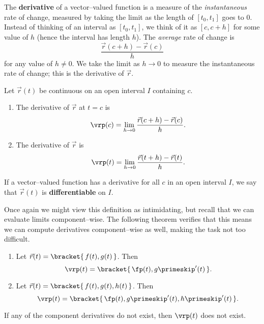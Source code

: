 The \textbf{derivative} of a vector--valued function is a measure of the \emph{instantaneous} rate of change, measured by taking the limit as the length of $[t_0,t_1]$ goes to 0. Instead of thinking of an interval as $[t_0,t_1]$, we think of it as $[c,c+h]$ for some value of $h$ (hence the interval has length $h$).  The \emph{average} rate of change is 
\[\frac{\vec r(c+h)-\vec r(c)}{h}\]
for any value of $h\neq0$. We take the limit as $h\to0$ to measure the instantaneous rate of change; this is the derivative of $\vec r$.


{Let $\vec r(t)$ be continuous on an open interval $I$ containing $c$.
\begin{enumerate}
	\item The derivative of $\vec r$ at $t=c$ is
	\[\vrp (c) = \lim_{h\to 0} \frac{\vec r(c+h) - \vec r(c)}{h}.\]
	\item	The derivative of $\vec r$ is
	\[\vrp (t) = \lim_{h\to 0} \frac{\vec r(t+h) - \vec r(t)}{h}.\]
\end{enumerate}}


If a vector--valued function has a derivative for all $c$ in an open interval $I$, we say that $\vec r(t)$ is \textbf{differentiable} on $I$.

Once again we might view this definition as intimidating, but recall that we can evaluate limits component--wise. The following theorem verifies that this means we can compute derivatives component--wise as well, making the task not too difficult.

{\begin{enumerate}
	\item Let $\vec r(t) =\bracket{\, f(t), g(t)\,}$. Then 
	\[\vrp(t) =\bracket{\, \fp(t), g\primeskip'(t)\,}.\]
	\item Let $\vec r(t) =\bracket{\, f(t), g(t), h(t)\,}$. Then
	\[\vrp(t) =\bracket{\, \fp(t), g\primeskip'(t), h\primeskip'(t)\,}.\]
\end{enumerate}
If any of the component derivatives do not exist, then $\vrp(t)$ does not exist.}

